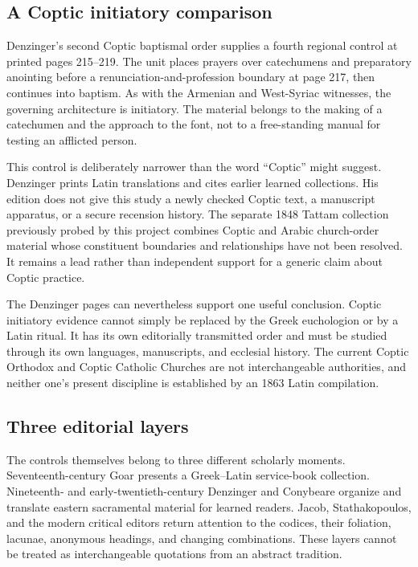\subsection{A Coptic initiatory comparison}

Denzinger's second Coptic baptismal order supplies a fourth regional control at
printed pages 215--219. The unit places prayers over catechumens and preparatory
anointing before a renunciation-and-profession boundary at page 217, then
continues into baptism. As with the Armenian and West-Syriac witnesses, the
governing architecture is initiatory. The material belongs to the making of a
catechumen and the approach to the font, not to a free-standing manual for
testing an afflicted person.

This control is deliberately narrower than the word ``Coptic'' might suggest.
Denzinger prints Latin translations and cites earlier learned collections. His
edition does not give this study a newly checked Coptic text, a manuscript
apparatus, or a secure recension history. The separate 1848 Tattam collection
previously probed by this project combines Coptic and Arabic church-order
material whose constituent boundaries and relationships have not been
resolved. It remains a lead rather than independent support for a generic
claim about Coptic practice.

The Denzinger pages can nevertheless support one useful conclusion. Coptic
initiatory evidence cannot simply be replaced by the Greek euchologion or by a
Latin ritual. It has its own editorially transmitted order and must be studied
through its own languages, manuscripts, and ecclesial history. The current
Coptic Orthodox and Coptic Catholic Churches are not interchangeable
authorities, and neither one's present discipline is established by an 1863
Latin compilation.

\subsection{Three editorial layers}

The controls themselves belong to three different scholarly moments.
Seventeenth-century Goar presents a Greek--Latin service-book collection.
Nineteenth- and early-twentieth-century Denzinger and Conybeare organize and
translate eastern sacramental material for learned readers. Jacob,
Stathakopoulos, and the modern critical editors return attention to the
codices, their foliation, lacunae, anonymous headings, and changing
combinations. These layers cannot be treated as interchangeable quotations
from an abstract tradition.


